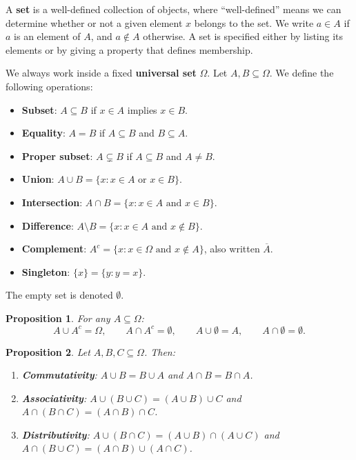 \documentclass{article}
\newtheorem{proposition}{Proposition}
\begin{document}
A \textbf{set} is a well-defined collection of objects, where ``well-defined'' means we can determine whether or not a given element $x$ belongs to the set. We write $a \in A$ if $a$ is an element of $A$, and $a \notin A$ otherwise. A set is specified either by listing its elements or by giving a property that defines membership.

We always work inside a fixed \textbf{universal set} $\Omega$. Let $A, B \subseteq \Omega$. We define the following operations:
\begin{itemize}
    \item \textbf{Subset}: $A \subseteq B$ if $x \in A$ implies $x \in B$.
    \item \textbf{Equality}: $A = B$ if $A \subseteq B$ and $B \subseteq A$.
    \item \textbf{Proper subset}: $A \subsetneq B$ if $A \subseteq B$ and $A \neq B$.
    \item \textbf{Union}: $A \cup B = \{x : x \in A \text{ or } x \in B\}$.
    \item \textbf{Intersection}: $A \cap B = \{x : x \in A \text{ and } x \in B\}$.
    \item \textbf{Difference}: $A \setminus B = \{x : x \in A \text{ and } x \notin B\}$.
    \item \textbf{Complement}: $A^c = \{x : x \in \Omega \text{ and } x \notin A\}$, also written $\overline{A}$.
    \item \textbf{Singleton}: $\{x\} = \{y : y = x\}$.
\end{itemize}
The empty set is denoted $\emptyset$.

\begin{proposition}
For any $A \subseteq \Omega$:
\[
A \cup A^c = \Omega, \qquad A \cap A^c = \emptyset, \qquad A \cup \emptyset = A, \qquad A \cap \emptyset = \emptyset.
\]
\end{proposition}

\begin{proposition}
Let $A, B, C \subseteq \Omega$. Then:
\begin{enumerate}
    \item \textbf{Commutativity}: $A \cup B = B \cup A$ and $A \cap B = B \cap A$.
    \item \textbf{Associativity}: $A \cup (B \cup C) = (A \cup B) \cup C$ and $A \cap (B \cap C) = (A \cap B) \cap C$.
    \item \textbf{Distributivity}: $A \cup (B \cap C) = (A \cup B) \cap (A \cup C)$ and $A \cap (B \cup C) = (A \cap B) \cup (A \cap C)$.
\end{enumerate}
\end{proposition}
\end{document}
